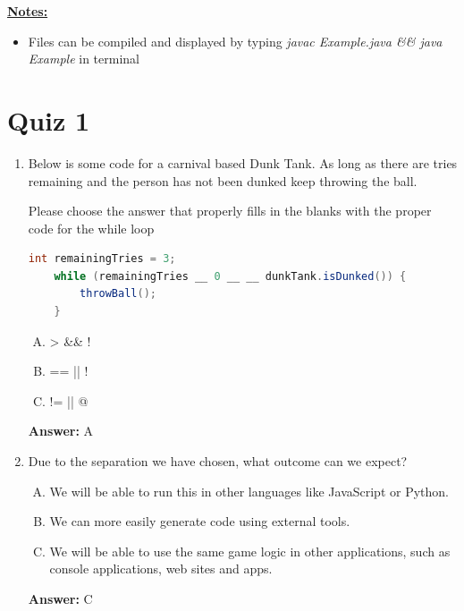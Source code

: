 \documentclass[12pt]{article}
\begin{document}
\bigskip

\underline{\textbf{Notes:}}

\bigskip

\begin{itemize}
    \item Files can be compiled and displayed by typing \textit{javac Example.java \&\& java Example}
    in terminal
\end{itemize}

\bigskip

\section{Quiz 1}

\bigskip

\begin{enumerate}[1.]
    \item

    Below is some code for a carnival based Dunk Tank. As long as there are tries
    remaining and the person has not been dunked keep throwing the ball.

    Please choose the answer that properly fills in the blanks with the proper code
    for the while loop

    \bigskip

    \begin{lstlisting}[language=Java,caption={lesson\_02/Game.java}]
    int remainingTries = 3;
    while (remainingTries __ 0 __ __ dunkTank.isDunked()) {
        throwBall();
    }
    \end{lstlisting}

    \begin{enumerate}[A.]
        \item >    \&\&   !
        \item ==    ||    !
        \item !=    ||        @
    \end{enumerate}

    \bigskip

    \textbf{Answer:} A

    \item

    Due to the separation we have chosen, what outcome can we expect?

    \bigskip

    \begin{enumerate}[A.]
        \item We will be able to run this in other languages like JavaScript or Python.
        \item We can more easily generate code using external tools.
        \item We will be able to use the same game logic in other applications, such as console applications, web sites and apps.
    \end{enumerate}

    \bigskip

    \textbf{Answer:} C

\end{enumerate}
\end{document}
